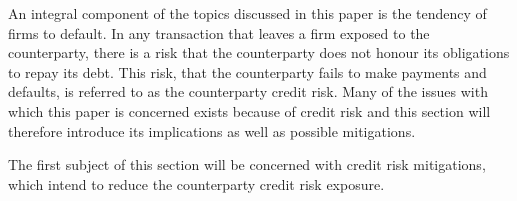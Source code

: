 \documentclass[main.tex]{subfiles}
\begin{document}
    An integral component of the topics discussed in this paper is the tendency of firms to default.
    In any transaction that leaves a firm exposed to the counterparty,
    there is a risk that the counterparty does not honour its obligations to repay its debt.
    This risk, that the counterparty fails to make payments and defaults, 
    is referred to as the counterparty credit risk.
    Many of the issues with which this paper is concerned exists because of credit risk 
    and this section will therefore introduce its implications as well as possible mitigations.

    The first subject of this section will be concerned with credit risk mitigations,
    which intend to reduce the counterparty credit risk exposure.
\end{document}
